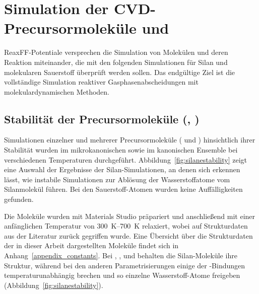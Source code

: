\chapter{Simulation der CVD-Precursormoleküle  und }

ReaxFF-Potentiale versprechen die Simulation von Molekülen und deren Reaktion miteinander, die mit den folgenden Simulationen für Silan und molekularen Sauerstoff überprüft werden sollen.
Das endgültige Ziel ist die vollständige Simulation reaktiver Gasphasenabscheidungen mit molekulardynamischen Methoden.

\section{Stabilität der Precursormoleküle (, )}

Simulationen einzelner und mehrerer Precursormoleküle ( und ) hinsichtlich ihrer Stabilität wurden im mikrokanonischen sowie im kanonischen Ensemble bei verschiedenen Temperaturen durchgeführt.
Abbildung~\ref{fig:silanestability} zeigt eine Auswahl der Ergebnisse der Silan-Simulationen, an denen sich erkennen lässt, wie instabile Simulationen zur Ablösung der Wasserstoffatome vom Silanmolekül führen.
Bei den Sauerstoff-Atomen wurden keine Auffälligkeiten gefunden.

Die Moleküle wurden mit Materials Studio\cite{biovia_materials_2014} präpariert und anschließend mit einer anfänglichen Temperatur von \SIrange{300}{700}{\kelvin} relaxiert, wobei auf Strukturdaten aus der Literatur zurück gegriffen wurde\cite{haynes_crc_2011}.
Eine Übersicht über die Strukturdaten der in dieser Arbeit dargestellten Moleküle findet sich in Anhang~\ref{appendix_constants}.
Bei , ,  und  behalten die Silan-Moleküle ihre Struktur, während bei den anderen Parametrisierungen einige der -Bindungen temperaturunabhängig brechen und so einzelne Wasserstoff-Atome freigeben (Abbildung~\ref{fig:silanestability}).

